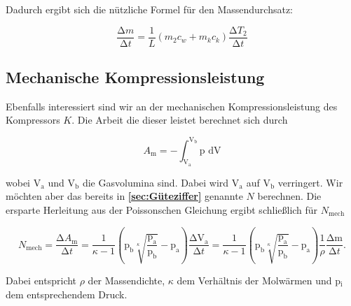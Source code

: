 Dadurch ergibt sich die nützliche Formel für den Massendurchsatz:

\begin{equation} \label{eq:massendurchsatz}
    \frac{\increment m}{\increment t} = \frac{1}{L} (m_{2} c_{w} + m_{k} c_{k}) \frac{\increment T_{2}}{\increment t}
\end{equation}

\subsection{Mechanische Kompressionsleistung}

Ebenfalls interessiert sind wir an der mechanischen Kompressionsleistung des Kompressors $K$.
Die Arbeit die dieser leistet berechnet sich durch

\begin{equation}
    A_{\text{m}} = - \int_{\text{V}_\text{a}}^{\text{V}_\text{b}} \text{p dV} 
\end{equation}

wobei $\text{V}_\text{a}$ und $\text{V}_\text{b}$ die Gasvolumina sind.
Dabei wird $\text{V}_\text{a}$ auf $\text{V}_\text{b}$ verringert.
Wir möchten aber das bereits in \textbf{\ref{sec:Güteziffer}} genannte $N$ berechnen.
Die ersparte Herleitung aus der Poissonschen Gleichung ergibt schließlich für $N_\text{mech}$

\begin{equation} \label{eq:n_mech}
    N_\text{mech} = \frac{\increment A_{\text{m}}} {\increment t}
    = \frac{1}{\kappa - 1} \left(\text{p}_\text{b} \sqrt[\kappa]{\frac{\text{p}_\text{a}}{\text{p}_\text{b}}
    } - \text{p}_\text{a} \right) \frac{\increment \text{V}_\text{a}}{\increment t}
    = \frac{1}{\kappa - 1} \left(\text{p}_\text{b} \sqrt[\kappa]{\frac{\text{p}_\text{a}}{\text{p}_\text{b}}
    } - \text{p}_\text{a} \right) \frac{1}{\rho} \frac{\increment \text{m}}{\increment t}.
\end{equation}

Dabei entspricht $\rho$ der Massendichte, $\kappa$ dem Verhältnis der Molwärmen und p$_\text{i}$ 
dem entsprechendem Druck.

